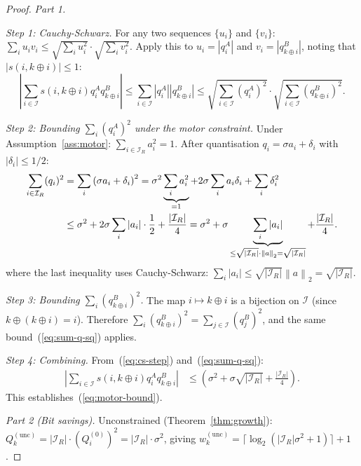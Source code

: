 \documentclass[11pt,a4paper]{article}
\theoremstyle{definition}
\theoremstyle{plain}
\theoremstyle{remark}
\newcommand{\norm}[1]{\left\|#1\right\|}
\begin{document}
\begin{proof}
\textit{Part 1.}

\emph{Step 1: Cauchy-Schwarz.}
For any two sequences $\{u_i\}$ and $\{v_i\}$:
$\sum_i u_i v_i \le \sqrt{\sum_i u_i^2}\cdot\sqrt{\sum_i v_i^2}.$
Apply this to $u_i=|q_i^A|$ and $v_i=|q_{k\oplus i}^B|$, noting that
$|s(i,k\oplus i)|\le1$:
\begin{equation}\label{eq:cs-step}
  \left|\sum_{i\in\mathcal{I}}s(i,k\oplus i)q_i^Aq_{k\oplus i}^B\right|
  \le\sum_{i\in\mathcal{I}}|q_i^A||q_{k\oplus i}^B|
  \le\sqrt{\sum_{i\in\mathcal{I}}(q_i^A)^2}\cdot\sqrt{\sum_{i\in\mathcal{I}}(q_{k\oplus i}^B)^2}.
\end{equation}

\emph{Step 2: Bounding $\sum_i(q_i^A)^2$ under the motor constraint.}
Under Assumption~\ref{ass:motor}: $\sum_{i\in\mathcal{I}_R}a_i^2=1$.
After quantisation $q_i=\sigma a_i+\delta_i$ with $|\delta_i|\le1/2$:
\begin{align}
  \sum_{i\in\mathcal{I}_R}(q_i)^2
  &= \sum_{i}\left(\sigma a_i+\delta_i\right)^2
  = \sigma^2\underbrace{\sum_i a_i^2}_{=1}
    +2\sigma\sum_i a_i\delta_i+\sum_i\delta_i^2
  \notag\\
  &\le \sigma^2+2\sigma\sum_i|a_i|\cdot\frac{1}{2}+\frac{|\mathcal{I}_R|}{4}
  = \sigma^2+\sigma\underbrace{\sum_i|a_i|}_{\le\sqrt{|\mathcal{I}_R|}\cdot\norm{a}_2=\sqrt{|\mathcal{I}_R|}}
    +\frac{|\mathcal{I}_R|}{4}.
    \label{eq:sum-q-sq}
\end{align}
where the last inequality uses Cauchy-Schwarz: $\sum_i|a_i|\le\sqrt{|\mathcal{I}_R|}\norm{a}_2=\sqrt{|\mathcal{I}_R|}$.

\emph{Step 3: Bounding $\sum_i(q_{k\oplus i}^B)^2$.}
The map $i\mapsto k\oplus i$ is a bijection on $\mathcal{I}$
(since $k\oplus(k\oplus i)=i$).
Therefore $\sum_i(q_{k\oplus i}^B)^2=\sum_{j\in\mathcal{I}}(q_j^B)^2$,
and the same bound~(\ref{eq:sum-q-sq}) applies.

\emph{Step 4: Combining.}
From~(\ref{eq:cs-step}) and~(\ref{eq:sum-q-sq}):
\begin{align}
  \left|\sum_{i\in\mathcal{I}}s(i,k\oplus i)q_i^Aq_{k\oplus i}^B\right|
  &\le \left(\sigma^2+\sigma\sqrt{|\mathcal{I}_R|}+\frac{|\mathcal{I}_R|}{4}\right).
\end{align}
This establishes~(\ref{eq:motor-bound}).

\textit{Part 2 (Bit savings).}
Unconstrained (Theorem~\ref{thm:growth}):
$Q_k^{(\mathrm{unc})}=|\mathcal{I}_R|\cdot(Q_i^{(0)})^2=|\mathcal{I}_R|\cdot\sigma^2$,
giving $w_k^{(\mathrm{unc})}=\lceil\log_2(|\mathcal{I}_R|\sigma^2+1)\rceil+1$.


\end{proof}
\end{document}
